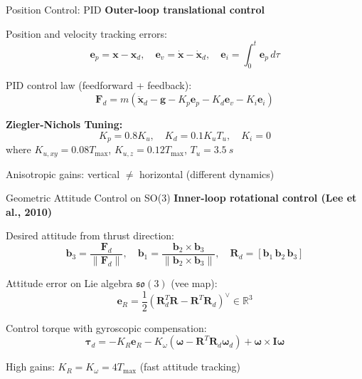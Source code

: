 \documentclass{beamer}
\begin{document}
\begin{frame}{Position Control: PID}
\textbf{Outer-loop translational control}

Position and velocity tracking errors:
\[
\mathbf{e}_p = \mathbf{x} - \mathbf{x}_d, \quad \mathbf{e}_v = \dot{\mathbf{x}} - \dot{\mathbf{x}}_d, \quad \mathbf{e}_i = \int_0^t \mathbf{e}_p \, d\tau
\]

PID control law (feedforward + feedback):
\[
\mathbf{F}_d = m(\ddot{\mathbf{x}}_d - \mathbf{g} - K_p \mathbf{e}_p - K_d \mathbf{e}_v - K_i \mathbf{e}_i)
\]

\textbf{Ziegler-Nichols Tuning:}
\[
K_p = 0.8 K_u, \quad K_d = 0.1 K_u T_u, \quad K_i = 0
\]
where $K_{u,xy} = 0.08 T_{\max}$, $K_{u,z} = 0.12 T_{\max}$, $T_u = \SI{3.5}{s}$

Anisotropic gains: vertical $\neq$ horizontal (different dynamics)
\end{frame}

\begin{frame}{Geometric Attitude Control on SO(3)}
\textbf{Inner-loop rotational control (Lee et al., 2010)}

Desired attitude from thrust direction:
\[
\mathbf{b}_3 = \frac{\mathbf{F}_d}{\|\mathbf{F}_d\|}, \quad \mathbf{b}_1 = \frac{\mathbf{b}_2 \times \mathbf{b}_3}{\|\mathbf{b}_2 \times \mathbf{b}_3\|}, \quad \mathbf{R}_d = [\mathbf{b}_1 \, \mathbf{b}_2 \, \mathbf{b}_3]
\]

Attitude error on Lie algebra $\mathfrak{so}(3)$ (vee map):
\[
\mathbf{e}_R = \frac{1}{2}(\mathbf{R}_d^T \mathbf{R} - \mathbf{R}^T \mathbf{R}_d)^\vee \in \mathbb{R}^3
\]

Control torque with gyroscopic compensation:
\[
\boldsymbol{\tau}_d = -K_R \mathbf{e}_R - K_\omega (\boldsymbol{\omega} - \mathbf{R}^T\mathbf{R}_d\boldsymbol{\omega}_d) + \boldsymbol{\omega} \times \mathbf{I}\boldsymbol{\omega}
\]

High gains: $K_R = K_\omega = 4T_{\max}$ (fast attitude tracking)
\end{frame}
\end{document}
